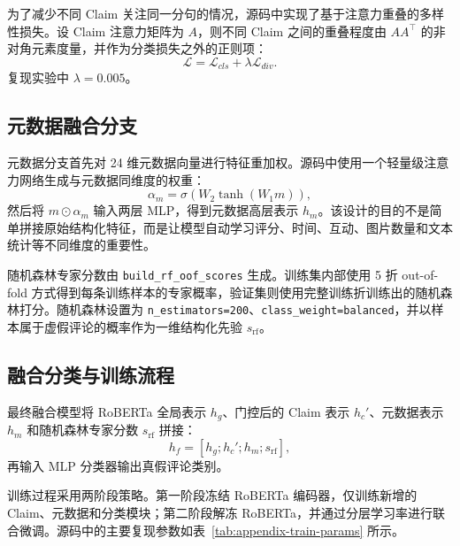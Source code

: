\documentclass[UTF8,oneside,openright,fontset=none]{ctexbook}
\numberwithin{equation}{chapter}
\begin{document}
为了减少不同 Claim 关注同一分句的情况，源码中实现了基于注意力重叠的多样性损失。设 Claim 注意力矩阵为 $A$，则不同 Claim 之间的重叠程度由 $AA^\top$ 的非对角元素度量，并作为分类损失之外的正则项：
\begin{equation}
  \mathcal{L}=\mathcal{L}_{cls}+\lambda \mathcal{L}_{div}.
\end{equation}
复现实验中 $\lambda=0.005$。

\subsection{元数据融合分支}
元数据分支首先对 24 维元数据向量进行特征重加权。源码中使用一个轻量级注意力网络生成与元数据同维度的权重：
\begin{equation}
  \alpha_m=\sigma\left(W_2 \tanh(W_1m)\right),
\end{equation}
然后将 $m\odot\alpha_m$ 输入两层 MLP，得到元数据高层表示 $h_m$。该设计的目的不是简单拼接原始结构化特征，而是让模型自动学习评分、时间、互动、图片数量和文本统计等不同维度的重要性。

随机森林专家分数由 \texttt{build\_rf\_oof\_scores} 生成。训练集内部使用 5 折 out-of-fold 方式得到每条训练样本的专家概率，验证集则使用完整训练折训练出的随机森林打分。随机森林设置为 \texttt{n\_estimators=200}、\texttt{class\_weight=balanced}，并以样本属于虚假评论的概率作为一维结构化先验 $s_{\mathrm{rf}}$。

\subsection{融合分类与训练流程}
最终融合模型将 RoBERTa 全局表示 $h_g$、门控后的 Claim 表示 $h_c'$、元数据表示 $h_m$ 和随机森林专家分数 $s_{\mathrm{rf}}$ 拼接：
\begin{equation}
  h_f=[h_g;h_c';h_m;s_{\mathrm{rf}}],
\end{equation}
再输入 MLP 分类器输出真假评论类别。

训练过程采用两阶段策略。第一阶段冻结 RoBERTa 编码器，仅训练新增的 Claim、元数据和分类模块；第二阶段解冻 RoBERTa，并通过分层学习率进行联合微调。源码中的主要复现参数如表~\ref{tab:appendix-train-params} 所示。
\end{document}
